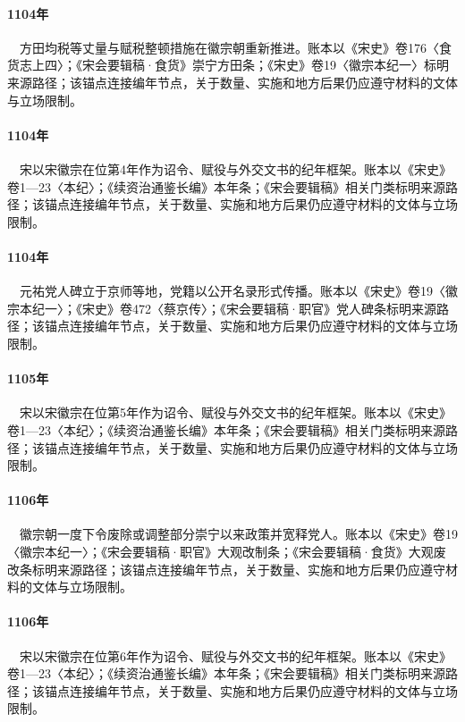 \paragraph{1104年}　方田均税等丈量与赋税整顿措施在徽宗朝重新推进。账本以《宋史》卷176〈食货志上四〉；《宋会要辑稿·食货》崇宁方田条；《宋史》卷19〈徽宗本纪一〉标明来源路径；该锚点连接编年节点，关于数量、实施和地方后果仍应遵守材料的文体与立场限制。

\paragraph{1104年}　宋以宋徽宗在位第4年作为诏令、赋役与外交文书的纪年框架。账本以《宋史》卷1—23〈本纪〉；《续资治通鉴长编》本年条；《宋会要辑稿》相关门类标明来源路径；该锚点连接编年节点，关于数量、实施和地方后果仍应遵守材料的文体与立场限制。

\paragraph{1104年}　元祐党人碑立于京师等地，党籍以公开名录形式传播。账本以《宋史》卷19〈徽宗本纪一〉；《宋史》卷472〈蔡京传〉；《宋会要辑稿·职官》党人碑条标明来源路径；该锚点连接编年节点，关于数量、实施和地方后果仍应遵守材料的文体与立场限制。

\paragraph{1105年}　宋以宋徽宗在位第5年作为诏令、赋役与外交文书的纪年框架。账本以《宋史》卷1—23〈本纪〉；《续资治通鉴长编》本年条；《宋会要辑稿》相关门类标明来源路径；该锚点连接编年节点，关于数量、实施和地方后果仍应遵守材料的文体与立场限制。

\paragraph{1106年}　徽宗朝一度下令废除或调整部分崇宁以来政策并宽释党人。账本以《宋史》卷19〈徽宗本纪一〉；《宋会要辑稿·职官》大观改制条；《宋会要辑稿·食货》大观废改条标明来源路径；该锚点连接编年节点，关于数量、实施和地方后果仍应遵守材料的文体与立场限制。

\paragraph{1106年}　宋以宋徽宗在位第6年作为诏令、赋役与外交文书的纪年框架。账本以《宋史》卷1—23〈本纪〉；《续资治通鉴长编》本年条；《宋会要辑稿》相关门类标明来源路径；该锚点连接编年节点，关于数量、实施和地方后果仍应遵守材料的文体与立场限制。

